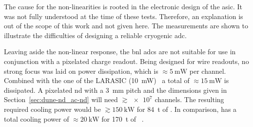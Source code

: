 The cause for the non-linearities is rooted in the electronic design of the \gls{asic}.
It was not fully understood at the time of these tests.
Therefore, an explanation is out of the scope of this work and not given here.
The measurements are shown to illustrate the difficulties of designing a reliable cryogenic \gls{adc}.

Leaving aside the non-linear response, the \gls{bnl} \glspl{adc} are not suitable for use in conjunction with a pixelated \lartpc{} charge readout.
Being designed for wire readouts, no strong focus was laid on power dissipation, which is $\approx \SI{5}{\milli\watt}$ per channel.
Combined with the one of the LARASIC (\SI{10}{\milli\watt})~\cite{larasic} a total of $\approx \SI{15}{\milli\watt}$ is dissipated.
A pixelated \dune{} \gls{nd} with a \SI{3}{\milli\metre} pitch and the dimensions given in Section~\ref{sec:dune-nd_ac-nd} will need $\gtrsim {\num{e7}}$ channels.
The resulting required cooling power would be $\gtrsim \SI{150}{\kilo\watt}$ for \SI{84}{\tonne} of \lar{}.
In comparison, \uboone{} has a total cooling power of $\approx \SI{20}{\kilo\watt}$ for \SI{170}{\tonne} of \lar{}~\cite{uboone}.


